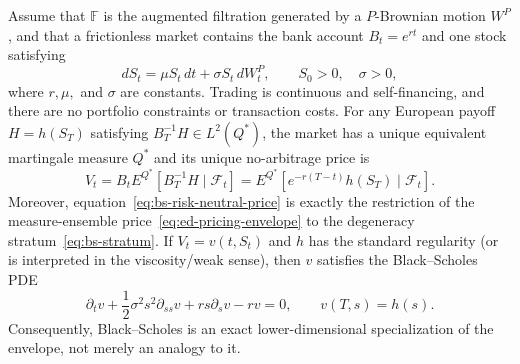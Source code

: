 \begin{theorem}
\label{thm:bs-specialization}
Assume that $\mathbb F$ is the augmented filtration generated by a
$P$-Brownian motion $W^P$, and that a frictionless market contains the bank
account $B_t=e^{rt}$ and one stock satisfying
\begin{equation}
  dS_t=\mu S_t\,dt+\sigma S_t\,dW_t^P,
  \qquad S_0>0,\quad \sigma>0,
  \label{eq:physical-gbm}
\end{equation}
where $r,\mu,$ and $\sigma$ are constants.  Trading is continuous and
self-financing, and there are no portfolio constraints or transaction costs.
For any European payoff $H=h(S_T)$ satisfying
$B_T^{-1}H\in L^2(Q^*)$, the market
has a unique equivalent martingale measure $Q^*$ and its unique no-arbitrage
price is
\begin{equation}
  V_t
  =B_tE^{Q^*}\!\left[B_T^{-1}H\mid\mathcal F_t\right]
  =E^{Q^*}\!\left[e^{-r(T-t)}h(S_T)\mid\mathcal F_t\right].
  \label{eq:bs-risk-neutral-price}
\end{equation}
Moreover, equation~\eqref{eq:bs-risk-neutral-price} is exactly the restriction
of the measure-ensemble price~\eqref{eq:ed-pricing-envelope} to the degeneracy
stratum~\eqref{eq:bs-stratum}.  If $V_t=v(t,S_t)$ and $h$ has the standard
regularity (or is interpreted in the viscosity/weak sense), then $v$ satisfies
the Black--Scholes PDE
\begin{equation}
  \partial_t v+\frac12\sigma^2s^2\partial_{ss}v
  +rs\partial_sv-rv=0,
  \qquad v(T,s)=h(s).
  \label{eq:bs-pde-rigorous}
\end{equation}
Consequently, Black--Scholes is an exact lower-dimensional specialization of
the envelope, not merely an analogy to it.
\end{theorem}

